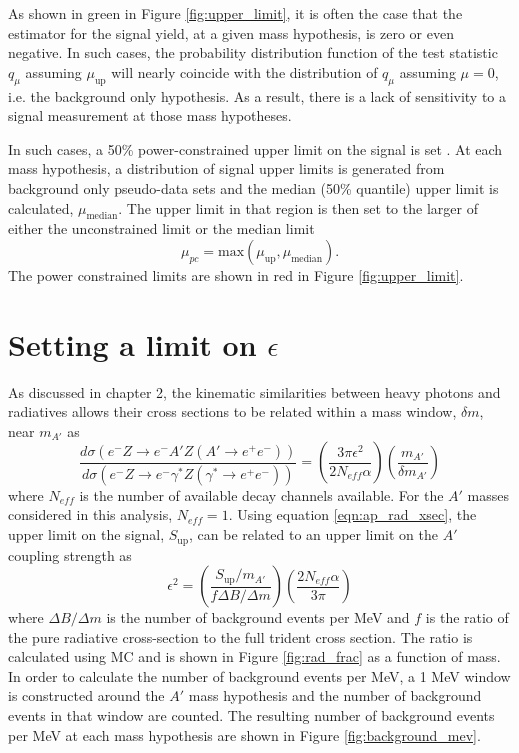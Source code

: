 As shown in green in Figure \ref{fig:upper_limit}, it is often the case that the
estimator for the signal yield, at a given mass hypothesis, is zero or
even negative.  In such cases, the probability distribution function of the
test statistic $q_{\mu}$ assuming $\mu_{\text{up}}$ will nearly coincide with 
the distribution of $q_{\mu}$ assuming $\mu = 0$, i.e. the background only 
hypothesis.  As a result, there is a lack of 
sensitivity to a signal measurement at those mass hypotheses.

In such cases, a 50\% power-constrained upper limit on the signal is set
\cite{Cowan:2011an}.
At each mass hypothesis, a distribution of signal upper limits is generated from
background only pseudo-data sets and the median (50\% quantile) upper limit
is calculated, $\mu_{\mbox{median}}$. The upper limit in that region is then set to 
the larger of either the unconstrained limit or the median limit
\begin{equation}
    \mu_{pc} = \mbox{max}(\mu_{\text{up}}, \mu_{\text{median}}).
\end{equation}
The power constrained limits are shown in red in Figure \ref{fig:upper_limit}.

\section{Setting a limit on $\epsilon$}

As discussed in chapter 2, the kinematic similarities between heavy photons and 
radiatives allows their cross sections to be related within a mass window, 
$\delta m$, near $m_{A'}$ as 
\begin{equation}
    \frac{d\sigma(e^-Z \rightarrow e^-A'Z(A' \rightarrow e^+e^-))}{
    d\sigma(e^-Z \rightarrow e^-\gamma^*Z(\gamma^* \rightarrow e^+e^-))} = 
    \left( \frac{3 \pi \epsilon^2}{2 N_{eff} \alpha} \right)
        \left( \frac{m_{A'}}{\delta m_{A'}} \right)
    \label{eqn:ap_rad_xsec}
\end{equation}
where $N_{eff}$ is the number of available decay channels available.  For the 
$A'$ masses considered in this analysis, $N_{eff} = 1$. Using equation 
\ref{eqn:ap_rad_xsec}, the upper limit on the signal, $S_{\text{up}}$, can be related to an
upper limit on the $A'$ coupling strength as 
\begin{equation}
    \epsilon^2 = \left (\frac{S_{\text{up}}/m_{A'}}{
                f\Delta B/\Delta m} \right) 
                \left(\frac{2 N_{eff} \alpha}{3 \pi} \right)
    \label{eqn:eps}
\end{equation}
where $\Delta B/\Delta m$ is the number of 
background events per MeV and $f$ is the ratio of the pure radiative cross-section to the full trident 
cross section.  The ratio is calculated using MC and is shown in Figure \ref{fig:rad_frac} as 
a function of mass.
In order to calculate the number of background 
events per MeV, a 1 MeV window is constructed around the $A'$ mass hypothesis
and the number of background events in that window are counted.  The resulting 
number of background events per MeV at each mass hypothesis are shown in Figure 
\ref{fig:background_mev}.  

